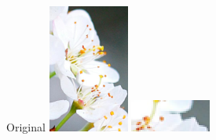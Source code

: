 \begin{figure}[H]
    \centering
    \noindent%
    \begin{minipage}{0.19\textwidth}
        \centering
        Original 
        \includegraphics[width=\textwidth]{img/flower/flower.png}
        \includegraphics[width=\textwidth]{img/flower/flower-close.png}

\end{minipage}
\end{figure}

